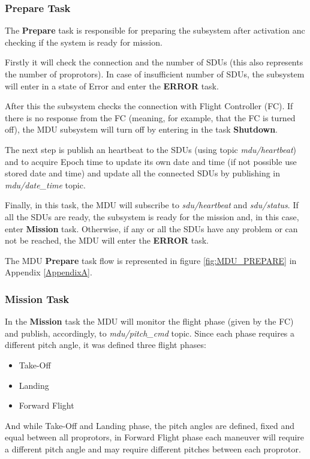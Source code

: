 \subsubsection{Prepare Task}
The \textbf{Prepare} task is responsible for preparing the subsystem after activation anc checking if the system is ready for mission.

Firstly it will check the connection and the number of  SDUs (this also represents the number of proprotors).
In case of insufficient number of SDUs, the subsystem will enter in a state of Error and enter the \textbf{ERROR} task.

After this the subsystem checks the connection with Flight Controller (FC).
If there is no response from the FC (meaning, for example, that the FC is turned off), the MDU subsystem will turn off by entering in the task \textbf{Shutdown}.

The next step is publish an heartbeat to the SDUs (using topic \textit{mdu\slash  heartbeat}) and to acquire Epoch time to update its own date and time (if not possible use stored date and time) and update all the connected SDUs by publishing in \textit{mdu\slash date\_time} topic.

Finally, in this task, the MDU will subscribe to \textit{sdu\slash heartbeat} and \textit{sdu\slash status}.
If all the SDUs are ready, the subsystem is ready for the mission and, in this case, enter \textbf{Mission} task.
Otherwise, if any or all the SDUs have any problem or can not be reached, the MDU will enter the \textbf{ERROR} task.

The MDU \textbf{Prepare} task flow is represented in figure \ref{fig:MDU_PREPARE} in Appendix \ref{AppendixA}.

\subsubsection{Mission Task}
In the \textbf{Mission} task the MDU will monitor the flight phase (given by the FC) and publish, accordingly, to \textit{mdu\slash pitch\_cmd} topic.
Since each phase requires a different pitch angle, it was defined three flight phases:
\begin{itemize}
    \item Take-Off
    \item Landing
    \item Forward Flight
\end{itemize}
And while Take-Off and Landing phase, the pitch angles are defined, fixed and equal between all proprotors, in Forward Flight phase each maneuver will require a different pitch angle and may require different pitches between each proprotor.

